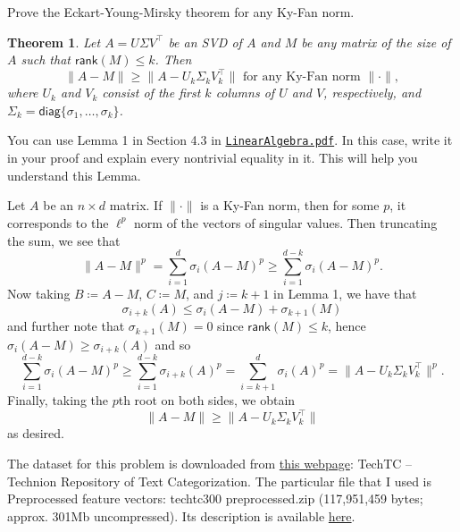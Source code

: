 \documentclass{../../../kin_math}
\newtheorem{theorem}{Theorem}
\begin{document}
\begin{questions}
  \question Prove the Eckart-Young-Mirsky theorem for any Ky-Fan norm.
  \begin{theorem}
    Let $A = U \Sigma V^\top$ be an SVD of $A$ and $M$ be any matrix of the size of $A$ such that $\textsf{rank}(M) \leq k$. Then
    \begin{equation*}
      \lVert A - M \rVert \geq \lVert A - U_k \Sigma_k V_k^\top \rVert \text{ for any Ky-Fan norm } \lVert \cdot \rVert,
    \end{equation*}
    where $U_k$ and $V_k$ consist of the first $k$ columns of $U$ and $V$, respectively, and $\Sigma_k = \textsf{diag}\{\sigma_1, \dots, \sigma_k\}$.
  \end{theorem}
  You can use Lemma 1 in Section 4.3 in \texttt{\href{https://www.math.umd.edu/~mariakc/AMSC660/LectureNotes/LinearAlgebra.pdf}{LinearAlgebra.pdf}}. In this case, write it in your proof and explain every nontrivial equality in it. This will help you understand this Lemma.
  \begin{solution}
    Let $A$ be an $n \times d$ matrix. If $\lVert \cdot \rVert$ is a Ky-Fan norm, then for some $p$, it corresponds to the $\ell^p$ norm of the vectors of singular values. Then truncating the sum, we see that
    \begin{equation*}
      \lVert A - M \rVert^p = \sum_{i = 1}^d \sigma_i(A - M)^p \geq \sum_{i = 1}^{d - k} \sigma_i(A - M)^p.
    \end{equation*}
    Now taking $B \coloneqq A - M$, $C \coloneqq M$, and $j \coloneqq k + 1$ in Lemma 1, we have that
    \begin{equation*}
      \sigma_{i + k}(A) \leq \sigma_i(A - M) + \sigma_{k + 1}(M)
    \end{equation*}
    and further note that $\sigma_{k + 1}(M) = 0$ since $\textsf{rank}(M) \leq k$, hence $\sigma_i(A - M) \geq \sigma_{i + k}(A)$ and so
    \begin{equation*}
      \sum_{i = 1}^{d - k} \sigma_i(A - M)^p \geq \sum_{i = 1}^{d - k} \sigma_{i + k}(A)^p = \sum_{i = k + 1}^d \sigma_i(A)^p = \lVert A - U_k \Sigma_k V_k^\top \rVert^p.
    \end{equation*}
    Finally, taking the $p$th root on both sides, we obtain
    \begin{equation*}
      \lVert A - M \rVert \geq \lVert A - U_k \Sigma_k V_k^\top \rVert
    \end{equation*}
    as desired.
  \end{solution}

  \question The dataset for this problem is downloaded from \href{https://gabrilovich.com/resources/data/techtc/techtc300/techtc300.html}{this webpage}: TechTC -- Technion Repository of Text Categorization. The particular file that I used is Preprocessed feature vectors: techtc300 preprocessed.zip (117,951,459 bytes; approx. 301Mb uncompressed). Its description is available \href{https://gabrilovich.com/resources/data/techtc/techtc.html}{here}.


\end{questions}
\end{document}
